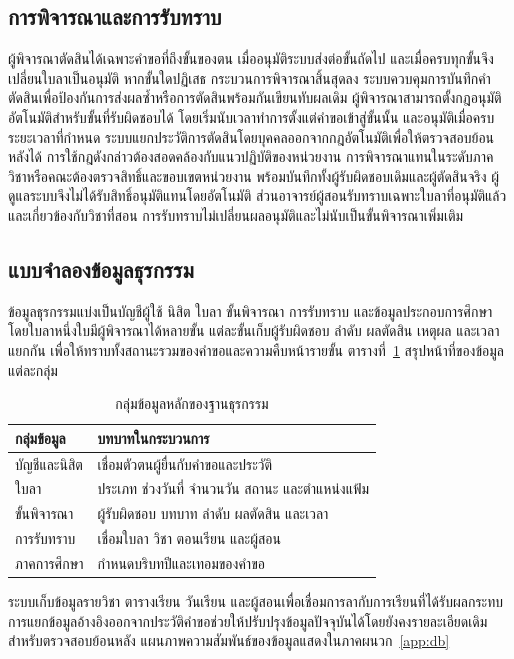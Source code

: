 \subsection{การพิจารณาและการรับทราบ}
ผู้พิจารณาตัดสินได้เฉพาะคำขอที่ถึงขั้นของตน เมื่ออนุมัติระบบส่งต่อขั้นถัดไป และเมื่อครบทุกขั้นจึงเปลี่ยนใบลาเป็นอนุมัติ หากขั้นใดปฏิเสธ กระบวนการพิจารณาสิ้นสุดลง ระบบควบคุมการบันทึกคำตัดสินเพื่อป้องกันการส่งผลซ้ำหรือการตัดสินพร้อมกันเขียนทับผลเดิม
ผู้พิจารณาสามารถตั้งกฎอนุมัติอัตโนมัติสำหรับขั้นที่รับผิดชอบได้ โดยเริ่มนับเวลาทำการตั้งแต่คำขอเข้าสู่ขั้นนั้น และอนุมัติเมื่อครบระยะเวลาที่กำหนด ระบบแยกประวัติการตัดสินโดยบุคคลออกจากกฎอัตโนมัติเพื่อให้ตรวจสอบย้อนหลังได้ การใช้กฎดังกล่าวต้องสอดคล้องกับแนวปฏิบัติของหน่วยงาน
การพิจารณาแทนในระดับภาควิชาหรือคณะต้องตรวจสิทธิ์และขอบเขตหน่วยงาน พร้อมบันทึกทั้งผู้รับผิดชอบเดิมและผู้ตัดสินจริง ผู้ดูแลระบบจึงไม่ได้รับสิทธิ์อนุมัติแทนโดยอัตโนมัติ ส่วนอาจารย์ผู้สอนรับทราบเฉพาะใบลาที่อนุมัติแล้วและเกี่ยวข้องกับวิชาที่สอน การรับทราบไม่เปลี่ยนผลอนุมัติและไม่นับเป็นขั้นพิจารณาเพิ่มเติม
\subsection{แบบจำลองข้อมูลธุรกรรม}
ข้อมูลธุรกรรมแบ่งเป็นบัญชีผู้ใช้ นิสิต ใบลา ขั้นพิจารณา การรับทราบ และข้อมูลประกอบการศึกษา โดยใบลาหนึ่งใบมีผู้พิจารณาได้หลายขั้น แต่ละขั้นเก็บผู้รับผิดชอบ ลำดับ ผลตัดสิน เหตุผล และเวลาแยกกัน เพื่อให้ทราบทั้งสถานะรวมของคำขอและความคืบหน้ารายขั้น ตารางที่~\ref{tab:operational-model} สรุปหน้าที่ของข้อมูลแต่ละกลุ่ม
\begin{table}[H]
\caption{กลุ่มข้อมูลหลักของฐานธุรกรรม}\label{tab:operational-model}
\centering
\begin{tabularx}{\columnwidth}{|p{23mm}|X|}
\hline
กลุ่มข้อมูล & บทบาทในกระบวนการ \\ \hline
บัญชีและนิสิต & เชื่อมตัวตนผู้ยื่นกับคำขอและประวัติ \\ \hline
ใบลา & ประเภท ช่วงวันที่ จำนวนวัน สถานะ และตำแหน่งแฟ้ม \\ \hline
ขั้นพิจารณา & ผู้รับผิดชอบ บทบาท ลำดับ ผลตัดสิน และเวลา \\ \hline
การรับทราบ & เชื่อมใบลา วิชา ตอนเรียน และผู้สอน \\ \hline
ภาคการศึกษา & กำหนดบริบทปีและเทอมของคำขอ \\ \hline
\end{tabularx}
\end{table}
ระบบเก็บข้อมูลรายวิชา ตารางเรียน วันเรียน และผู้สอนเพื่อเชื่อมการลากับการเรียนที่ได้รับผลกระทบ การแยกข้อมูลอ้างอิงออกจากประวัติคำขอช่วยให้ปรับปรุงข้อมูลปัจจุบันได้โดยยังคงรายละเอียดเดิมสำหรับตรวจสอบย้อนหลัง แผนภาพความสัมพันธ์ของข้อมูลแสดงในภาคผนวก~\ref{app:db}

